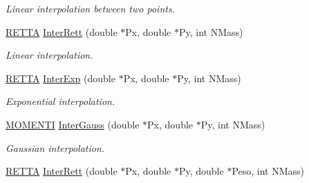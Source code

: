 \begin{DoxyCompactItemize}
\begin{DoxyCompactList}\small\item\em \-Linear interpolation between two points. \end{DoxyCompactList}\item 
\hypertarget{classMatematica_a704c5213772cd3d9fd7dd77d74461bf2}{\hyperlink{structRETTA}{\-R\-E\-T\-T\-A} \hyperlink{classMatematica_a704c5213772cd3d9fd7dd77d74461bf2}{\-Inter\-Rett} (double $\ast$\-Px, double $\ast$\-Py, int \-N\-Mass)}\label{classMatematica_a704c5213772cd3d9fd7dd77d74461bf2}

\begin{DoxyCompactList}\small\item\em \-Linear interpolation. \end{DoxyCompactList}\item 
\hypertarget{classMatematica_a54633464985cd9a4864e2d0245fa231c}{\hyperlink{structRETTA}{\-R\-E\-T\-T\-A} \hyperlink{classMatematica_a54633464985cd9a4864e2d0245fa231c}{\-Inter\-Exp} (double $\ast$\-Px, double $\ast$\-Py, int \-N\-Mass)}\label{classMatematica_a54633464985cd9a4864e2d0245fa231c}

\begin{DoxyCompactList}\small\item\em \-Exponential interpolation. \end{DoxyCompactList}\item 
\hypertarget{classMatematica_ae9688b8f498233bf332032c7dafc1982}{\hyperlink{structMOMENTI}{\-M\-O\-M\-E\-N\-T\-I} \hyperlink{classMatematica_ae9688b8f498233bf332032c7dafc1982}{\-Inter\-Gauss} (double $\ast$\-Px, double $\ast$\-Py, int \-N\-Mass)}\label{classMatematica_ae9688b8f498233bf332032c7dafc1982}

\begin{DoxyCompactList}\small\item\em \-Gaussian interpolation. \end{DoxyCompactList}\item 
\hypertarget{classMatematica_ad5a7658737a31da4e856a760a9beed80}{\hyperlink{structRETTA}{\-R\-E\-T\-T\-A} \hyperlink{classMatematica_ad5a7658737a31da4e856a760a9beed80}{\-Inter\-Rett} (double $\ast$\-Px, double $\ast$\-Py, double $\ast$\-Peso, int \-N\-Mass)}\label{classMatematica_ad5a7658737a31da4e856a760a9beed80}


\end{DoxyCompactItemize}
